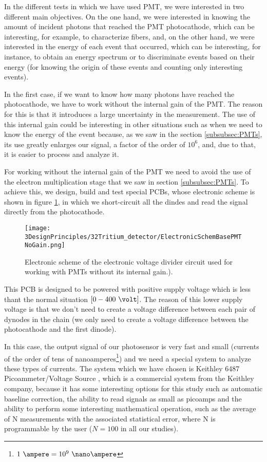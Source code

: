 In the different tests in which we have used PMT, we were interested in two different main objectives. On the one hand, we were interested in knowing the amount of incident photons that reached the PMT photocathode, which can be interesting, for example, to characterize fibers, and, on the other hand, we were interested in the energy of each event that occurred, which can be interesting, for instance, to obtain an energy spectrum or to discriminate events based on their energy (for knowing the origin of these events and counting only interesting events).

In the first case, if we want to know how many photons have reached the photocathode, we have to work without the internal gain of the PMT. The reason for this is that it introduces a large uncertainty in the measurement. The use of this internal gain could be interesting in other situations such as when we need to know the energy of the event because, as we saw in the section \ref{subsubsec:PMTs}, its use greatly enlarges our signal, a factor of the order of $10^6$, and, due to that, it is easier to process and analyze it.

For working without the internal gain of the PMT we need to avoid the use of the electron multiplication stage that we saw in section \ref{subsubsec:PMTs}. To achieve this, we design, build and test special PCBs, whose electronic scheme is shown in figure \ref{fig:ElectronicSchemeBasePMTNoGain}, in which we short-circuit all the dindes and read the signal directly from the photocathode.

\begin{figure}[htbp]
\centering
\texttt{[image: 3DesignPrinciples/32Tritium\_detector/ElectronicSchemBasePMTNoGain.png]}
\caption{Electronic scheme of the electronic voltage divider circuit used for working with PMTs without its internal gain.).\label{fig:ElectronicSchemeBasePMTNoGain}}
\end{figure}

This PCB is designed to be powered with positive supply voltage which is less thant the normal situation $[0-400~\volt]$. The reason of this lower supply voltage is that we don't need to create a voltage difference between each pair of dynodes in the chain (we only need to create a voltage difference between the photocathode and the first dinode).

In this case, the output signal of our photosensor is very fast and small (currents of the order of tens of nanoamperes\footnote{$1~\ampere=10^{9}~\nano\ampere$}) and we need a special system to analyze these types of currents. The system which we have chosen is Keithley 6487 Picoammeter/Voltage Source \cite{DataSheetKeithley6487}, which is a commercial system from the Keithley company, because it has some interesting options for this study such as automatic baseline correction, the ability to read signals as small as picoamps and the ability to perform some interesting mathematical operation, such as the average of N measurements with the associated statistical error, where N is programmable by the user ($N=100$ in all our studies).

